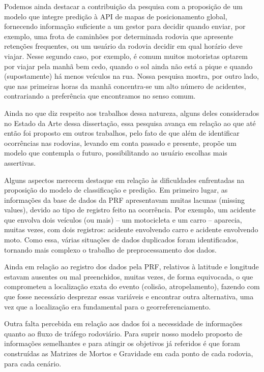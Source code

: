 Podemos ainda destacar a contribuição da pesquisa com a proposição de um modelo que integre predição à
API de mapas de posicionamento global, fornecendo informação suficiente a um gestor para decidir quando enviar,
por exemplo, uma frota de caminhões por determinada rodovia que apresente retenções frequentes, ou um usuário da rodovia decidir em qual horário deve viajar. Nesse segundo caso, por exemplo, é comum muitos motoristas optarem por viajar pela manhã bem cedo, quando o sol ainda não está a pique e quando (supostamente) há menos veículos na rua. Nossa pesquisa mostra, por outro lado, que nas primeiras horas da manhã concentra-se um alto número de acidentes, contrariando a preferência que encontramos no senso comum.  

Ainda no que diz respeito aos trabalhos dessa natureza, alguns deles considerados no Estado da Arte dessa dissertação, essa pesquisa avança em relação ao que até então foi proposto em outros trabalhos, pelo fato de que além de identificar ocorrências nas rodovias, levando em conta passado e presente, propõe um modelo que contempla o futuro, possibilitando ao usuário escolhas mais assertivas.

Alguns aspectos merecem destaque em relação às dificuldades enfrentadas na proposição do modelo de classificação e predição. Em primeiro lugar, as informações da base de dados da PRF apresentavam muitas lacunas (missing values), devido ao tipo de registro feito na ocorrência. Por exemplo, um acidente que envolva dois veículos (ou mais) -- um motocicleta e um carro -- aparecia, muitas vezes, com dois registros: acidente envolvendo carro e acidente envolvendo moto. Como essa, várias situações de dados duplicados foram identificados, tornando mais complexo o trabalho de preprocessamento dos dados.

Ainda em relação ao registro dos dados pela PRF, relativos à latitude e longitude estavam ausentes ou mal preenchidos, muitas vezes, de forma equivocada, o que comprometeu a localização exata do evento (colisão, atropelamento), fazendo com que fosse necessário desprezar essas variáveis e encontrar outra alternativa, uma vez que a localização era fundamental para o georreferenciamento.

Outra falta percebida em relação aos dados foi a necessidade de informações quanto ao fluxo de tráfego rodoviário. Para suprir nosso modelo proposto de informações semelhantes e para atingir os objetivos já referidos é que foram construídas as Matrizes de Mortos e Gravidade em cada ponto de cada rodovia, para cada cenário.

